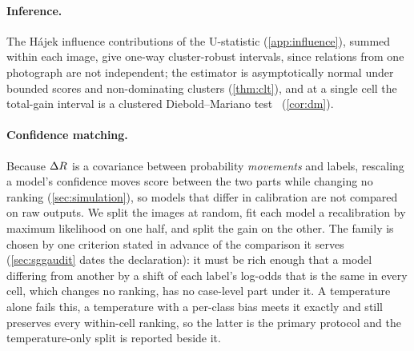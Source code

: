 \paragraph{Inference.}\label{sec:inference} The H\'ajek influence contributions of the
U-statistic (\cref{app:influence}), summed within each image, give one-way cluster-robust
intervals, since relations from one photograph are not independent; the estimator is
asymptotically normal under bounded scores and non-dominating clusters (\cref{thm:clt}),
and at a single cell the total-gain interval is a clustered Diebold--Mariano
test~\cite{diebold1995comparing} (\cref{cor:dm}).

\paragraph{Confidence matching.}\label{sec:matching} Because $\Delta R$ is a covariance between
probability \emph{movements} and labels, rescaling a model's confidence moves score between the
two parts while changing no ranking (\cref{sec:simulation}), so models that differ in
calibration are not compared on raw outputs. We split the images at random, fit each model a
recalibration by maximum likelihood on one half, and split the gain on the other. The family
is chosen by one criterion stated in advance of the comparison it serves (\cref{sec:sggaudit}
dates the declaration): it must be rich enough that a model
differing from another by a shift of each label's log-odds that is the same in every cell,
which changes no ranking, has no case-level part under it. A temperature alone fails this, a temperature with
a per-class bias meets it exactly and still preserves every within-cell ranking, so the
latter is the primary protocol and the temperature-only split is reported beside it.

